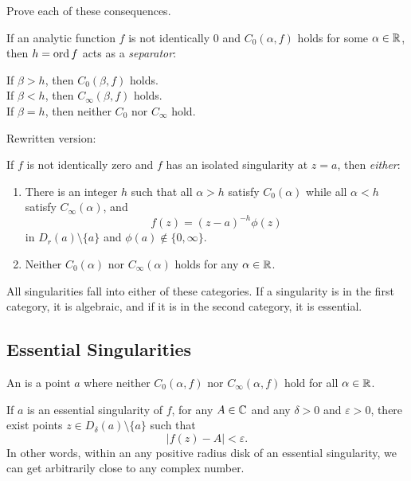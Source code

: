 \begin{exercise}
    Prove each of these consequences.
\end{exercise}

\begin{theorem}
    If an analytic function $f$ is not identically $0$ and
    $C_0(\alpha, f)$ holds for some $\alpha \in \operatorname{\mathbb{R}}$, then
    $h = \operatorname{ord} f$ acts as a \textit{separator}:
    \begin{center}
        If $\beta > h$, then $C_0(\beta, f)$ holds. \\
        If $\beta < h$, then $C_{\infty}(\beta, f)$ holds. \\
        If $\beta = h$, then neither $C_0$ nor $C_{\infty}$ hold.
    \end{center}
\end{theorem}

Rewritten version:
\begin{theorem}
    If $f$ is not identically zero and $f$ has an isolated
    singularity at $z=a$, then \textit{either}:
    \begin{enumerate}
        \item There is an integer $h$ such that all $\alpha > h$
            satisfy $C_{0}(\alpha)$ while all $\alpha < h$
            satisfy $C_{\infty}(\alpha)$, and
            \[ f(z) = {(z-a)}^{-h} \phi(z) \]
            in $D_r(a) \setminus \{a\}$ and $\phi(a) \notin
            \{0, \infty \}$.
        \item Neither $C_0(\alpha)$ nor $C_{\infty}(\alpha)$
            holds for any $\alpha \in \operatorname{\mathbb{R}}$.
    \end{enumerate}
\end{theorem}
All singularities fall into either of these categories.
If a singularity is in the first category, it is algebraic,
and if it is in the second category, it is essential.



\subsection{Essential Singularities}

\begin{definition}
    An  is a point $a$ where neither
    $C_0(\alpha, f)$ nor $C_{\infty} (\alpha, f)$ hold for
    all $\alpha \in \operatorname{\mathbb{R}}$.
\end{definition}

\begin{theorem}
    If $a$ is an essential singularity of $f$,
    for any $A \in \operatorname{\mathbb{C}}$ and any $\delta > 0$ and $\varepsilon > 0$,
    there exist points $z \in D_{\delta}(a) \setminus \{a\}$
    such that 
    \[ |f(z) - A| < \varepsilon. \]
    In other words, within an any positive radius disk of an
    essential singularity, we can get arbitrarily close to
    any complex number.
\end{theorem}

